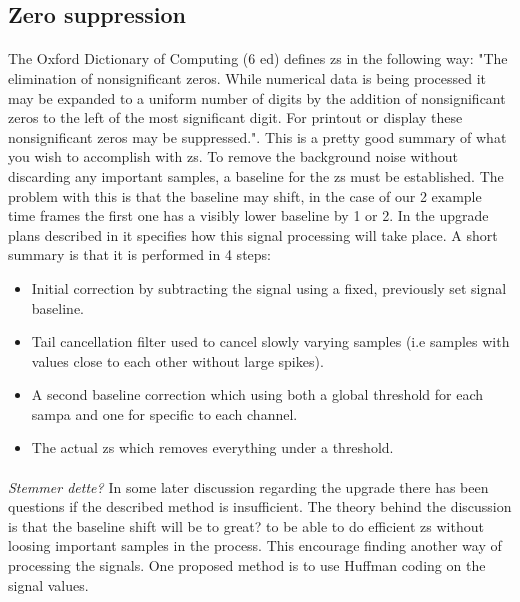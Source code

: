 \documentclass[a4paper, 12pt]{report}
\begin{document}
\subsection{Zero suppression} %
\paragraph{}
The Oxford Dictionary of Computing (6 ed) defines \gls{zs} in the following way: "The elimination of nonsignificant zeros.
While numerical data is being processed it may be expanded to a uniform number of digits by the addition of nonsignificant zeros to the left of the most significant digit.
For printout or display these nonsignificant zeros may be suppressed."\cite{zerosuppression}.
This is a pretty good summary of what you wish to accomplish with \gls{zs}.
To remove the background noise without discarding any important samples, a baseline for the \gls{zs} must be established.
The problem with this is that the baseline may shift, in the case of our 2 example time frames the first one has a visibly lower baseline by 1 or 2.
In the upgrade plans described in \cite{tdr-015} it specifies how this signal processing will take place.
A short summary is that it is performed in 4 steps:

\begin{itemize}
	\item Initial correction by subtracting the signal using a fixed, previously set signal baseline.
	\item Tail cancellation filter used to cancel slowly varying samples (i.e samples with values close to each other without large spikes).
	\item A second baseline correction which using both a global threshold for each \gls{sampa} and one for specific to each channel.
	\item The actual \gls{zs} which removes everything under a threshold.
\end{itemize}

%
\paragraph{}
\textit{Stemmer dette?}
In some later discussion regarding the upgrade there has been questions if the described method is insufficient.
The theory behind the discussion is that the baseline shift will be to great? to be able to do efficient \gls{zs} without loosing important samples in the process.
This encourage finding another way of processing the signals.
One proposed method is to use Huffman coding on the signal values.
\end{document}
